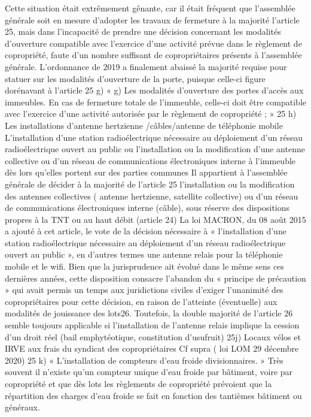 \begin{list}{}{}
					Cette situation était extrêmement gênante, car il était fréquent que l’assemblée générale soit en mesure d’adopter les travaux de fermeture à la majorité l’article 25, mais dans l’incapacité de prendre une décision concernant les modalités d’ouverture compatible avec l’exercice d’une activité prévue dans le règlement de copropriété, faute d’un nombre suffisant de copropriétaires présents à l’assemblée générale.
					L’ordonnance de 2019 a finalement abaissé la majorité requise pour statuer sur les modalités d’ouverture de la porte, puisque celle-ci figure dorénavant à l’article 25 g)
					« g) Les modalités d'ouverture des portes d'accès aux immeubles. En cas de fermeture totale de l'immeuble, celle-ci doit être compatible avec l'exercice d'une activité autorisée par le règlement de copropriété ; »
					25 h) Les installations d’antenne hertzienne /câbles/antenne de téléphonie mobile
					L'installation d'une station radioélectrique nécessaire au déploiement d'un réseau radioélectrique ouvert au public ou l'installation ou la modification d'une antenne collective ou d'un réseau de communications électroniques interne à l'immeuble dès lors qu'elles portent sur des parties communes
					Il appartient à l'assemblée générale de décider à la majorité de l'article 25 l'installation ou la modification des antennes collectives ( antenne hertzienne, satellite collective) ou d’un réseau de communications électroniques interne (câble), sous réserve des dispositions propres à la TNT ou au haut débit (article 24)
					La loi MACRON, du 08 août 2015 a ajouté à cet article, le vote de la décision nécessaire à « l'installation d'une station radioélectrique nécessaire au déploiement d'un réseau radioélectrique ouvert au public », en d’autres termes une antenne relais pour la téléphonie mobile et le wifi. Bien que la jurisprudence ait évolué dans le même sens ces dernières années, cette disposition consacre l’abandon du « principe de précaution » qui avait permis un temps
					aux juridictions civiles d’exiger l’unanimité des copropriétaires pour cette décision, en raison de l’atteinte (éventuelle) aux modalités de jouissance des lots26.
					Toutefois, la double majorité de l’article 26 semble toujours applicable si l’installation de l’antenne relais implique la cession d’un droit réel (bail emphytéotique, constitution d’usufruit)
					25j) Locaux vélos et IRVE aux frais du syndicat des copropriétaires
					Cf supra ( loi LOM 29 décembre 2020)
					25 k) « L'installation de compteurs d'eau froide divisionnaires. »
					Très souvent il n’existe qu’un compteur unique d’eau froide par bâtiment, voire par copropriété et que dès lots les règlements de copropriété prévoient que la répartition des charges d’eau froide se fait en fonction des tantièmes bâtiment ou généraux.

\end{list}
